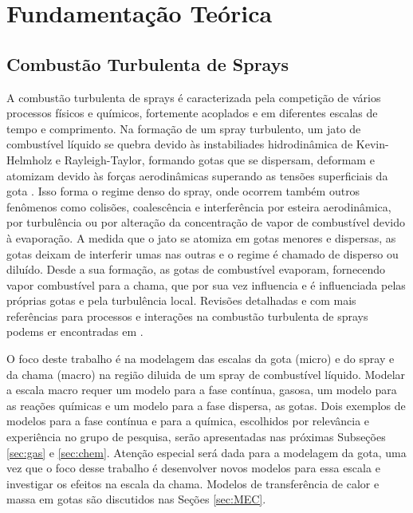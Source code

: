 \section{Fundamentação Teórica}



\subsection{Combustão Turbulenta de Sprays}

A combustão turbulenta de sprays é caracterizada pela competição de vários processos físicos e químicos, fortemente acoplados e em diferentes escalas de tempo e comprimento. 
Na formação de um spray turbulento, um jato de combustível líquido se quebra devido às instabiliades hidrodinâmica de Kevin-Helmholz e Rayleigh-Taylor, formando gotas que se dispersam, deformam e atomizam devido às forças aerodinâmicas superando as tensões superficiais da gota \cite{JennyB2012}.
Isso forma o {regime denso} do spray, onde ocorrem também outros fenômenos como colisões, coalescência e interferência por esteira aerodinâmica, por turbulência ou por alteração da concentração de vapor de combustível devido à evaporação.
A medida que o jato se atomiza em gotas menores e dispersas, as gotas deixam de interferir umas nas outras e o regime é chamado de disperso ou diluído. 
Desde a sua formação, as gotas de combustível evaporam, fornecendo vapor combustível para a chama, que por sua vez influencia e é influenciada pelas próprias gotas e pela turbulência local.
Revisões detalhadas e com mais referências para processos e interações na combustão turbulenta de sprays podems er encontradas em \cite{JennyB2012, MasriA2016, SanchezA2015, ZhouL2021}.

O foco deste trabalho é na modelagem das escalas da gota (micro) e do spray e da chama (macro) na região diluida de um spray de combustível líquido.
Modelar a escala macro requer um modelo para a fase contínua, gasosa, um modelo para as reações químicas e um modelo para a fase dispersa, as gotas.
Dois exemplos de modelos para a fase contínua e para a química, escolhidos por relevância e experiência no grupo de pesquisa, serão apresentadas nas próximas Subseções \ref{sec:gas} e \ref{sec:chem}.
Atenção especial será dada para a modelagem da gota, uma vez que o foco desse trabalho é desenvolver novos modelos para essa escala e investigar os efeitos na escala da chama.
Modelos de transferência de calor e massa em gotas são discutidos nas Seções \ref{sec:MEC}. 

